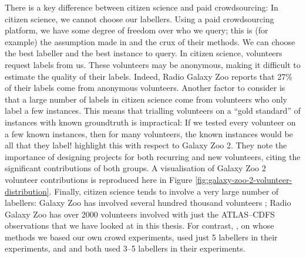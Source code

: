     There is a key difference between citizen science and paid crowdsourcing: In
    citizen science, we cannot choose our labellers. Using a paid crowdsourcing
    platform, we have some degree of freedom over who we query; this is (for
    example) the assumption made in \citet{yan11} and the crux of their methods.
    We can choose the best labeller and the best instance to query. In citizen
    science, volunteers request labels from us. These volunteers may be
    anonymous, making it difficult to estimate the quality of their labels.
    Indeed, Radio Galaxy Zoo reports that 27\% of their labels come from
    anonymous volunteers. Another factor to consider is that a large number of
    labels in citizen science come from volunteers who only label a few
    instances. This means that trialling volunteers on a ``gold standard'' of
    instances with known groundtruth is impractical: If we tested every
    volunteer on a few known instances, then for many volunteers, the known
    instances would be all that they label! \citet{marshall15} highlight this
    with respect to Galaxy Zoo 2. They note the importance of designing projects
    for both recurring and new volunteers, citing the significant contributions
    of both groups. A visualisation of Galaxy Zoo 2 volunteer contributions is
    reproduced here in Figure \ref{fig:galaxy-zoo-2-volunteer-distribution}.
    Finally, citizen science tends to involve a very large number of labellers:
    Galaxy Zoo has involved several hundred thousand volunteers
    \citep{marshall15}; Radio Galaxy Zoo has over 2000 volunteers involved with
    just the ATLAS--CDFS observations that we have looked at in this thesis. For
    contrast, \citet{raykar10}, on whose methods we based our own crowd
    experiments, used just 5 labellers in their experiments, and
    \citet{mozafari12} and \citet{yan11} both used 3--5 labellers in their
    experiments.

